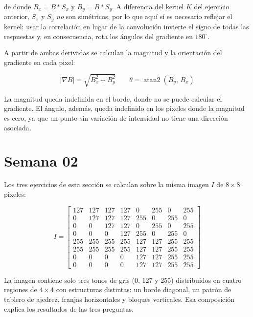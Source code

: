 \documentclass[12pt, a4paper]{article}
\begin{document}
de donde $B_x = B * S_x$ y $B_y = B * S_y$. A diferencia del kernel $K$ del ejercicio anterior, $S_x$ y $S_y$ \emph{no} son simétricos, por lo que aquí sí es necesario reflejar el kernel: usar la correlación en lugar de la convolución invierte el signo de todas las respuestas y, en consecuencia, rota los ángulos del gradiente en $180^\circ$.

A partir de ambas derivadas se calculan la magnitud y la orientación del gradiente en cada pixel:

\begin{equation}
|\nabla B| = \sqrt{B_x^2 + B_y^2}
\qquad
\theta = \operatorname{atan2}(B_y,\, B_x)
\end{equation}

La magnitud queda indefinida en el borde, donde no se puede calcular el gradiente. El ángulo, además, queda indefinido en los pixeles donde la magnitud es cero, ya que un punto sin variación de intensidad no tiene una dirección asociada.

\section{Semana 02}
\label{sec:semana02}

Los tres ejercicios de esta sección se calculan sobre la misma imagen $I$ de $8 \times 8$ pixeles:

\[
I =
\begin{bmatrix}
127 & 127 & 127 & 127 & 0 & 255 & 0 & 255 \\
0 & 127 & 127 & 127 & 255 & 0 & 255 & 0 \\
0 & 0 & 127 & 127 & 0 & 255 & 0 & 255 \\
0 & 0 & 0 & 127 & 255 & 0 & 255 & 0 \\
255 & 255 & 255 & 255 & 127 & 127 & 255 & 255 \\
255 & 255 & 255 & 255 & 127 & 127 & 255 & 255 \\
0 & 0 & 0 & 0 & 127 & 127 & 255 & 255 \\
0 & 0 & 0 & 0 & 127 & 127 & 255 & 255
\end{bmatrix}
\]

La imagen contiene solo tres tonos de gris (0, 127 y 255) distribuidos en cuatro regiones de $4 \times 4$ con estructuras distintas: un borde diagonal, un patrón de tablero de ajedrez, franjas horizontales y bloques verticales. Esa composición explica los resultados de las tres preguntas.
\end{document}
